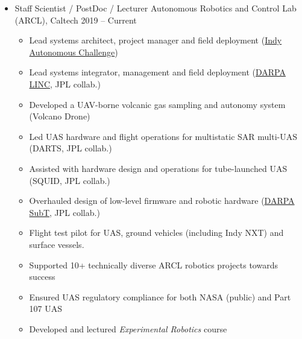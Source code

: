 \documentclass[12pt,letter,sans]{moderncv}
\begin{document}
\begin{itemize}

\item{\cventry
    {}
    {Staff Scientist / PostDoc / Lecturer}
    {Autonomous Robotics and Control Lab (ARCL), Caltech}
    {2019 -- Current}
	{}
	{ 
        \vspace{3pt} 
        \begin{itemize}
			\item Lead systems architect, project manager and field deployment (\href{https://www.indyautonomouschallenge.com/california-institute-of-technology-joins-the-indy-autonomous-challenge}{Indy Autonomous Challenge})            
            \item Lead systems integrator, management and field deployment (\href{https://www.darpa.mil/news-events/2024-3-7}{DARPA LINC}, JPL collab.)
            \item Developed a UAV-borne volcanic gas sampling and autonomy system (Volcano Drone)%
            \item Led UAS hardware and flight operations for multistatic SAR multi-UAS (DARTS, JPL collab.) %
            \item Assisted with hardware design and operations for tube-launched UAS (SQUID, JPL collab.)
            \item Overhauled design of low-level firmware and robotic hardware (\href{https://www.darpa.mil/program/darpa-subterranean-challenge}{DARPA SubT}, JPL collab.)
            \item Flight test pilot for UAS, ground vehicles (including Indy NXT) and surface vessels.
            \item Supported 10+ technically diverse ARCL robotics projects towards success
            \item Ensured UAS regulatory compliance for both NASA (public) and Part 107 UAS
            \item Developed and lectured \textit{Experimental Robotics} course %
        \end{itemize}
    }
}


\end{itemize}
\end{document}
